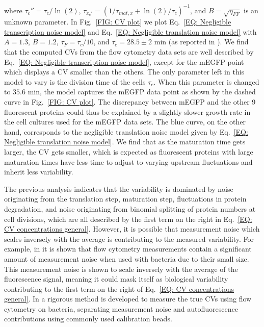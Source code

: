 \documentclass[%
 reprint,prx,
superscriptaddress,
%
%
%
%
%
%
%
%
%
 amsmath,amssymb,
 aps,
%
%
%
%
%
%
]{revtex4-2}
\begin{document}
{{{where $\tau_{c}'' = \tau_{c}/\ln(2)$, $\tau_{x_{c}'} = \left(1/\tau_{mat,x} + \ln(2)/\tau_{c}\right)^{-1}$, and $B = \sqrt{\eta_{FF}}$ is an unknown parameter. In Fig.~\ref{FIG: CV plot} we plot Eq.~\eqref{EQ: Negligible transcription noise model} and Eq.~\eqref{EQ: Negligible translation noise model} with $A = 1.3$, $B = 1.2$, $\tau_{F} = \tau_{c}/10$, and $\tau_{c} = 28.5 \pm 2$ min (as reported in \cite{Balleza2018}). We find that the computed CVs from the flow cytometry data sets are well described by Eq.~\eqref{EQ: Negligible transcription noise model}, except for the mEGFP point which displays a CV smaller than the others. The only parameter left in this model to vary is the division time of the cells $\tau_{c}$. When this parameter is changed to $35.6$ min, the model captures the mEGFP data point as shown by the dashed curve in Fig.~\ref{FIG: CV plot}. The discrepancy between mEGFP and the other 9 fluorescent proteins could thus be explained by a slightly slower growth rate in the cell cultures used for the mEGFP data sets. The blue curve, on the other hand, corresponds to the negligible translation noise model given by Eq.~\eqref{EQ: Negligible translation noise model}. We find that as the maturation time gets larger, the CV gets smaller, which is expected as fluorescent proteins with large maturation times have less time to adjust to varying upstream fluctuations and inherit less variability. }





{
The previous analysis indicates that the variability is dominated by noise originating from the translation step, maturation step, fluctuations in protein degradation, and noise originating from binomial splitting of protein numbers at cell divisions, which are all described by the first term on the right in Eq.~\eqref{EQ: CV concentrations general}. However, it is possible that measurement noise which scales inversely with the average is contributing to the measured variability. For example, in \cite{galbusera2020using} it is shown that flow cytometry measurements contain a significant amount of measurement noise when used with bacteria due to their small size. This measurement noise is shown to scale inversely with the average of the fluorescence signal, meaning it could mask itself as biological variability contributing to the first term on the right of Eq.~\eqref{EQ: CV concentrations general}. 
%
In \cite{galbusera2020using} a rigorous method is developed to measure the true CVs using flow cytometry on bacteria, separating measurement noise and autofluorescence contributions using commonly used calibration beads.}


}}
\end{document}
